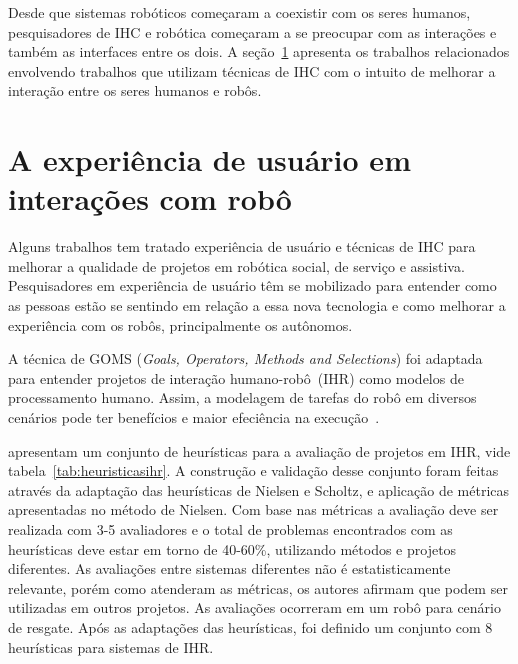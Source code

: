Desde que sistemas robóticos começaram a coexistir com os seres humanos, pesquisadores de IHC e robótica começaram a se preocupar com as interações e também as interfaces entre os dois. A seção~\ref{sec:ihrux} apresenta os trabalhos relacionados envolvendo trabalhos que utilizam técnicas de IHC com o intuito de melhorar a interação entre os seres humanos e robôs.

\section{A experiência de usuário em interações com robô}
\label{sec:ihrux}
Alguns trabalhos tem tratado experiência de usuário e técnicas de IHC para melhorar a qualidade de projetos em robótica social, de serviço e assistiva. Pesquisadores em experiência de usuário têm se mobilizado para entender como as pessoas estão se sentindo em relação a essa nova tecnologia e como melhorar a experiência com os robôs, principalmente os autônomos.

A técnica de GOMS (\emph{Goals, Operators, Methods and Selections}) foi adaptada para entender projetos de interação humano-robô~(IHR) como modelos de processamento humano. Assim, a modelagem de tarefas do robô em diversos cenários pode ter benefícios e maior efeciência na execução~\cite{drury:2007}.

\textcite{clarkson:2007} apresentam um conjunto de heurísticas para a avaliação de projetos em IHR, vide tabela~\ref{tab:heuristicasihr}. A construção e validação desse conjunto foram feitas através da adaptação das heurísticas de Nielsen e Scholtz, e aplicação de métricas apresentadas no método de Nielsen. Com base nas métricas a avaliação deve ser realizada com 3-5 avaliadores e o total de problemas encontrados com as heurísticas deve estar em torno de 40-60\%, utilizando métodos e projetos diferentes. As avaliações entre sistemas diferentes não é estatisticamente relevante, porém como atenderam as métricas, os autores afirmam que podem ser utilizadas em outros projetos. As avaliações ocorreram em um robô para cenário de resgate. Após as adaptações das heurísticas, foi definido um conjunto com 8 heurísticas para sistemas de IHR.

